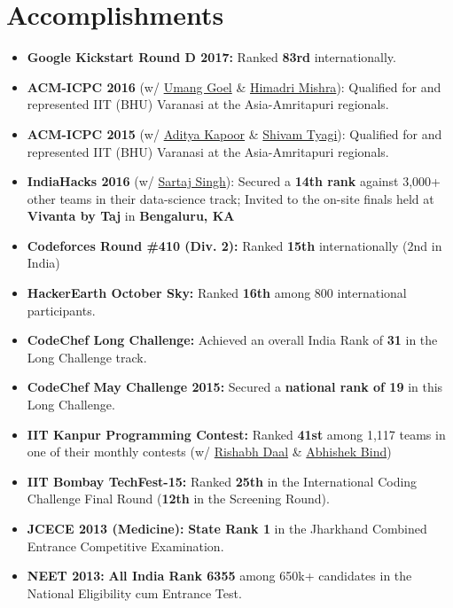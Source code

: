 \documentclass[a4paper,11pt]{article}
\newcommand{\resumeItemListStart}{\begin{itemize}[label=$\circ$,leftmargin=0.15in,itemsep=1.0mm]}
\newcommand{\resumeItemListEnd}{\end{itemize}\vspace{1mm}}
\begin{document}
\section{\Large{\textbf{Accomplishments}}}
\vspace{2mm}
\resumeItemListStart
\item \textbf{Google Kickstart Round D 2017:} Ranked \textbf{83rd} internationally.
\item \textbf{ACM-ICPC 2016} (w/ \href{https://www.linkedin.com/in/umang-goel-508872b3/}{Umang Goel} \& \href{https://www.linkedin.com/in/hmishra2250/}{Himadri Mishra}): Qualified for and represented IIT (BHU) Varanasi at the Asia-Amritapuri regionals.
\item \textbf{ACM-ICPC 2015} (w/ \href{https://www.linkedin.com/in/aditya-kapoor-75847b83/}{Aditya Kapoor} \& \href{https://www.linkedin.com/in/shivamtyagi95/}{Shivam Tyagi}): Qualified for and represented IIT (BHU) Varanasi at the Asia-Amritapuri regionals.
\item \textbf{IndiaHacks 2016} (w/ \href{https://www.linkedin.com/in/sartaj-singh-5ab461a5/}{Sartaj Singh}): Secured a \textbf{14th rank} against 3,000+ other teams in their data-science track; Invited to the on-site finals held at \textbf{Vivanta by Taj} in \textbf{Bengaluru, KA}
\item \textbf{Codeforces Round \#410 (Div. 2):} Ranked \textbf{15th} internationally (2nd in India)
\item \textbf{HackerEarth October Sky:} Ranked \textbf{16th} among 800 international participants.
\item \textbf{CodeChef Long Challenge:} Achieved an overall India Rank of \textbf{31} in the Long Challenge track.
\item \textbf{CodeChef May Challenge 2015:} Secured a \textbf{national rank of 19} in this Long Challenge.
\item \textbf{IIT Kanpur Programming Contest:} Ranked \textbf{41st} among 1,117 teams in one of their monthly contests (w/ \href{https://www.linkedin.com/in/rishabh-daal-972a99a4/}{Rishabh Daal} \& \href{https://www.linkedin.com/in/abhishekbind2013/}{Abhishek Bind})
\item \textbf{IIT Bombay TechFest-15:} Ranked \textbf{25th} in the International Coding Challenge Final Round (\textbf{12th} in the Screening Round).
\item \textbf{JCECE 2013 (Medicine):} \textbf{State Rank 1} in the Jharkhand Combined Entrance Competitive Examination.
\item \textbf{NEET 2013:} \textbf{All India Rank 6355} among 650k+ candidates in the National Eligibility cum Entrance Test.
\resumeItemListEnd
\end{document}
